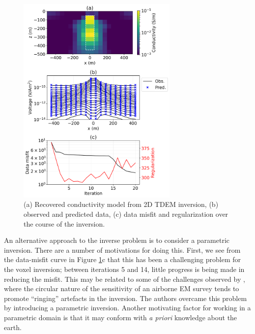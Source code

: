 \documentclass[paper]{geophysics}
\begin{document}
\begin{figure}[!htb]
  \centering
  \includegraphics[width=0.7\textwidth]{figures/2Dvoxel_inversion.png}
  \caption{(a) Recovered conductivity model from 2D TDEM inversion, (b) observed and predicted data, (c) data misfit and regularization over the course of the inversion.}
  \label{fig:2Dvoxel_inversion}
\end{figure}

An alternative approach to the inverse problem is to consider a parametric inversion. There are a number of motivations for doing this. First, we see from the data-misfit curve in Figure \ref{fig:2Dvoxel_inversion}c that this has been a challenging problem for the voxel inversion; between iterations 5 and 14, little progress is being made in reducing the misfit. This may be related to some of the challenges observed by \cite{mcmillan2015}, where the circular nature of the sensitivity of an airborne EM survey tends  to promote ``ringing'' artefacts in the inversion. The authors overcame this problem by introducing a parametric inversion. Another motivating factor for working in a parametric domain is that it may conform with \emph{a priori} knowledge about the earth.
\end{document}
